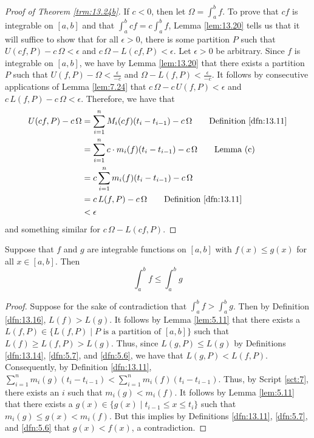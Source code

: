 \documentclass[../main.tex]{subfiles}
\begin{document}
\begin{theorem}
\begin{proof}[Proof of Theorem \ref{trm:13.24b}]
        If $c<0$, then let $\Omega=\int_a^bf$. To prove that $cf$ is integrable on $[a,b]$ and that $\int_a^bcf=c\int_a^bf$, Lemma \ref{lem:13.20} tells us that it will suffice to show that for all $\epsilon>0$, there is some partition $P$ such that $U(cf,P)-c\,\Omega<\epsilon$ and $c\,\Omega-L(cf,P)<\epsilon$. Let $\epsilon>0$ be arbitrary. Since $f$ is integrable on $[a,b]$, we have by Lemma \ref{lem:13.20} that there exists a partition $P$ such that $U(f,P)-\Omega<\frac{\epsilon}{-c}$ and $\Omega-L(f,P)<\frac{\epsilon}{-c}$. It follows by consecutive applications of Lemma \ref{lem:7.24} that $c\,\Omega-c\, U(f,P)<\epsilon$ and $c\, L(f,P)-c\,\Omega<\epsilon$. Therefore, we have that
        \begin{align*}
            U(cf,P)-c\,\Omega &= \sum_{i=1}^nM_i(cf)(t_i-t_{i-1})-c\,\Omega\tag*{Definition \ref{dfn:13.11}}\\
            &= \sum_{i=1}^nc\cdot m_i(f)(t_i-t_{i-1})-c\,\Omega\tag*{Lemma (c)}\\
            &= c\sum_{i=1}^nm_i(f)(t_i-t_{i-1})-c\,\Omega\\
            &= c\, L(f,P)-c\,\Omega\tag*{Definition \ref{dfn:13.11}}\\
            &< \epsilon
        \end{align*}
        and something similar for $c\,\Omega-L(cf,P)$.
    \end{proof}
\end{theorem}

\begin{theorem}\label{trm:13.25}
    Suppose that $f$ and $g$ are integrable functions on $[a,b]$ with $f(x)\leq g(x)$ for all $x\in[a,b]$. Then
    \begin{equation*}
        \int_a^bf \leq \int_a^bg
    \end{equation*}
    \begin{proof}
        Suppose for the sake of contradiction that $\int_a^bf>\int_a^bg$. Then by Definition \ref{dfn:13.16}, $L(f)>L(g)$. It follows by Lemma \ref{lem:5.11} that there exists a $L(f,P)\in\{L(f,P)\mid P\text{ is a partition of }[a,b]\}$ such that $L(f)\geq L(f,P)>L(g)$. Thus, since $L(g,P)\leq L(g)$ by Definitions \ref{dfn:13.14}, \ref{dfn:5.7}, and \ref{dfn:5.6}, we have that $L(g,P)<L(f,P)$. Consequently, by Definition \ref{dfn:13.11}, $\sum_{i=1}^nm_i(g)(t_i-t_{i-1})<\sum_{i=1}^nm_i(f)(t_i-t_{i-1})$. Thus, by Script \ref{sct:7}, there exists an $i$ such that $m_i(g)<m_i(f)$. It follows by Lemma \ref{lem:5.11} that there exists a $g(x)\in\{g(x)\mid t_{i-1}\leq x\leq t_i\}$ such that $m_i(g)\leq g(x)<m_i(f)$. But this implies by Definitions \ref{dfn:13.11}, \ref{dfn:5.7}, and \ref{dfn:5.6} that $g(x)<f(x)$, a contradiction.
    \end{proof}
\end{theorem}
\end{document}
